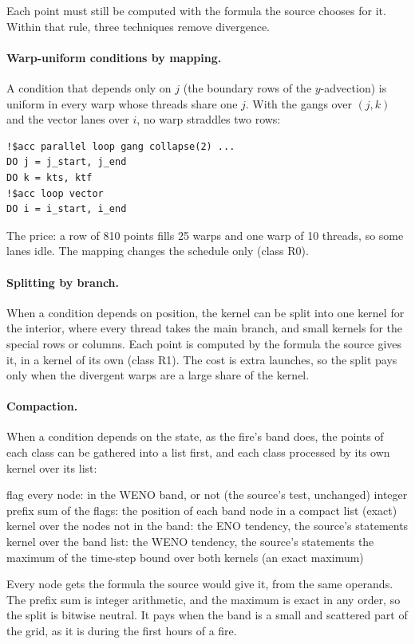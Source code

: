Each point must still be computed with the formula the source chooses for it. Within that rule, three techniques
remove divergence.

\paragraph{Warp-uniform conditions by mapping.} A condition that depends only on $j$ (the boundary rows of the
$y$-advection) is uniform in every warp whose threads share one $j$. With the gangs over $(j, k)$ and the vector
lanes over $i$, no warp straddles two rows:
\begin{lstlisting}
!$acc parallel loop gang collapse(2) ...
DO j = j_start, j_end
DO k = kts, ktf
!$acc loop vector
DO i = i_start, i_end
\end{lstlisting}
The price: a row of 810 points fills 25 warps and one warp of 10 threads, so some lanes idle. The mapping changes the
schedule only (class R0).

\paragraph{Splitting by branch.} When a condition depends on position, the kernel can be split into one kernel for the
interior, where every thread takes the main branch, and small kernels for the special rows or columns. Each point is
computed by the formula the source gives it, in a kernel of its own (class R1). The cost is extra launches, so the
split pays only when the divergent warps are a large share of the kernel.

\paragraph{Compaction.} When a condition depends on the state, as the fire's band does, the points of each class can
be gathered into a list first, and each class processed by its own kernel over its list:
\begin{algorithm}[ht]
\caption{Splitting the level-set tendency by band (phase S6-12.1; class R1).}
\label{alg:band-split}
\begin{algorithmic}[1]
\State flag every node: in the WENO band, or not (the source's test, unchanged)
\State integer prefix sum of the flags: the position of each band node in a compact list (exact)
\State kernel over the nodes not in the band: the ENO tendency, the source's statements
\State kernel over the band list: the WENO tendency, the source's statements
\State the maximum of the time-step bound over both kernels (an exact maximum)
\end{algorithmic}
\end{algorithm}
Every node gets the formula the source would give it, from the same operands. The prefix sum is integer arithmetic,
and the maximum is exact in any order, so the split is bitwise neutral. It pays when the band is a small and scattered
part of the grid, as it is during the first hours of a fire.

